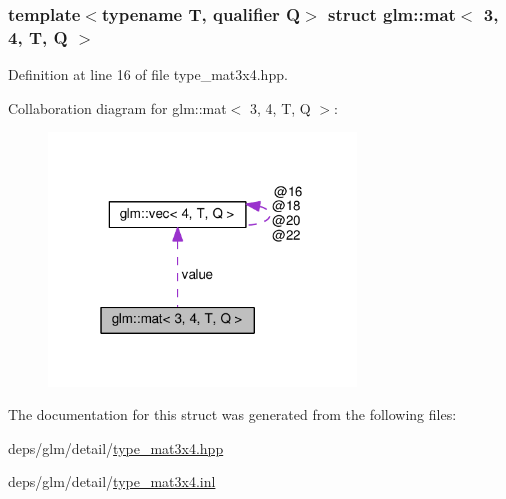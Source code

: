 \subsubsection*{template$<$typename T, qualifier Q$>$\newline
struct glm\+::mat$<$ 3, 4, T, Q $>$}



Definition at line 16 of file type\+\_\+mat3x4.\+hpp.



Collaboration diagram for glm\+:\+:mat$<$ 3, 4, T, Q $>$\+:
\nopagebreak
\begin{figure}[H]
\begin{center}
\leavevmode
\includegraphics[width=232pt]{de/d4c/structglm_1_1mat_3_013_00_014_00_01T_00_01Q_01_4__coll__graph}
\end{center}
\end{figure}


The documentation for this struct was generated from the following files\+:\begin{DoxyCompactItemize}
\item 
deps/glm/detail/\hyperlink{type__mat3x4_8hpp}{type\+\_\+mat3x4.\+hpp}\item 
deps/glm/detail/\hyperlink{type__mat3x4_8inl}{type\+\_\+mat3x4.\+inl}\end{DoxyCompactItemize}
